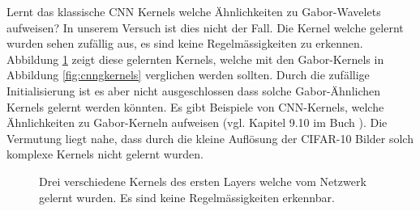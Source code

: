 Lernt das klassische CNN Kernels welche Ähnlichkeiten zu Gabor-Wavelets aufweisen?
In unserem Versuch ist dies nicht der Fall.
Die Kernel welche gelernt wurden sehen zufällig aus, es sind keine Regelmässigkeiten zu erkennen.
Abbildung \ref{fig:cnnkernels} zeigt diese gelernten Kernels, welche mit den Gabor-Kernels in Abbildung \ref{fig:cnngkernels} verglichen werden sollten.
Durch die zufällige Initialisierung ist es aber nicht ausgeschlossen dass solche Gabor-Ähnlichen Kernels gelernt werden könnten.
Es gibt Beispiele von CNN-Kernels, welche Ähnlichkeiten zu Gabor-Kerneln aufweisen (vgl. Kapitel 9.10 im Buch \cite{book:deeplearning}).
Die Vermutung liegt nahe, dass durch die kleine Auflösung der CIFAR-10 Bilder solch komplexe Kernels nicht gelernt wurden.

\begin{figure}
	\centering
	\caption{Drei verschiedene Kernels des ersten Layers welche vom Netzwerk gelernt wurden. Es sind keine Regelmässigkeiten erkennbar.}
	\label{fig:cnnkernels}
\end{figure}

